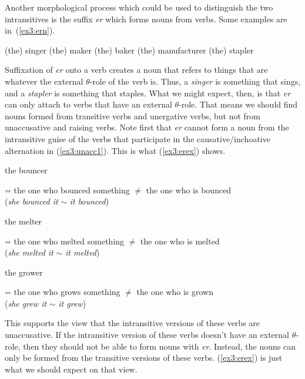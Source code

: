 Another morphological process which could be used to distinguish the two intransitives is the suffix \textit{er} which forms nouns from verbs. Some examples are in~(\ref{ex3:ern}).
\begin{exe}
\raggedright
	\ex \label{ex3:ern}
	\begin{xlist}
		\ex (the) singer
		\ex (the) maker
		\ex (the) baker
		\ex (the) manufacturer
		\ex (the) stapler
	\end{xlist}
\end{exe}
Suffixation of \textit{er} onto a verb creates a noun that refers to things that are whatever the external $\theta$-role of the verb is. Thus, a \textit{singer} is something that sings, and a \textit{stapler} is something that staples. What we might expect, then, is that \textit{er} can only attach to verbs that have an external $\theta$-role. That means we should find nouns formed from transitive verbs and unergative verbs, but not from unaccusative and raising verbs. Note first that \textit{er} cannot form a noun from the intransitive guise of the verbs that participate in the causative/inchoative alternation in (\ref{ex3:unacc1}). This is what (\ref{ex3:erex}) shows. 
\pagebreak
\begin{exe}
\raggedright
	\ex \label{ex3:erex}
	\begin{xlist}
		\ex the bouncer
		\begin{xlist}
			\sn = the one who bounced something
			\sn $\neq$ the one who is bounced\\
			(\textit{she bounced it} $\sim$ \textit{it bounced})
		\end{xlist}
		\ex the melter
		\begin{xlist}
			\sn = the one who melted something 
			\sn $\neq$ the one who is melted\\
			(\textit{she melted it} $\sim$ \textit{it melted})
		\end{xlist}
		\ex the grower
		\begin{xlist}
			\sn = the one who grows something
			\ex $\neq$ the one who is grown\\
			(\textit{she grew it} $\sim$ \textit{it grew})
		\end{xlist}
	\end{xlist}
\end{exe}
This supports the view that the intransitive versions of these verbs are unaccusative. If the intransitive version of these verbs doesn't have an external $\theta$-role, then they should not be able to form nouns with \textit{er}. Instead, the nouns can only be formed from the transitive versions of these verbs. (\ref{ex3:erex}) is just what we should expect on that view. 

